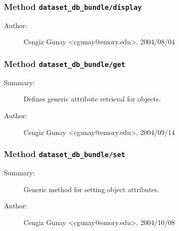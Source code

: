 \subsubsection[Method \texttt{display}]{Method \texttt{dataset\_db\_bundle/display}}%
%
\label{ref_dataset_db_bundle__display}%
\hypertarget{ref_dataset_db_bundle__display}{}%
\begin{description}
%
%
%
%
%
%
%
\item[Author:]%
Cengiz Gunay <cgunay@emory.edu>, 2004/08/04%
\end{description}
\methodline%
\subsubsection[Method \texttt{get}]{Method \texttt{dataset\_db\_bundle/get}}%
%
\label{ref_dataset_db_bundle__get}%
\hypertarget{ref_dataset_db_bundle__get}{}%
\begin{description}
\item[Summary:]Defines generic attribute retrieval for objects.
%
%
%
%
%
%
%
\item[Author:]%
Cengiz Gunay <cgunay@emory.edu>, 2004/09/14%
\end{description}
\methodline%
\subsubsection[Method \texttt{set}]{Method \texttt{dataset\_db\_bundle/set}}%
%
\label{ref_dataset_db_bundle__set}%
\hypertarget{ref_dataset_db_bundle__set}{}%
\begin{description}
\item[Summary:]Generic method for setting object attributes.
%
%
%
%
%
%
%
\item[Author:]%
Cengiz Gunay <cgunay@emory.edu>, 2004/10/08%
\end{description}
\methodline%
